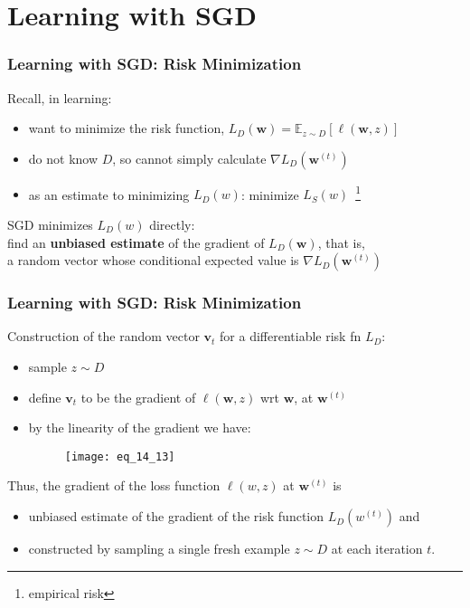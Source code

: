 \section{Learning with SGD}

\begin{frame}
\frametitle{Learning with SGD: Risk Minimization}

Recall, in learning:\\
\begin{itemize}
\item want to minimize the risk function, $L_D(\mathbf{w}) = \mathbb{E}_{z \sim D} [\ell(\mathbf{w}, z)]$
\item do not know $D$, so cannot simply calculate $\nabla L_D (\mathbf{w}^{(t)} )$
\item as an estimate to minimizing $L_D(w)$: minimize $L_S(w)$~\footnote{empirical risk}
\end{itemize}
\vspace{5mm}

SGD minimizes $L_D(w)$ directly:\\
find an \textbf{unbiased estimate} of the gradient of $L_D(\mathbf{w})$, that is,\\
a random vector whose conditional expected value is $\nabla L_D (\mathbf{w}^{(t)} )$

\end{frame}


\begin{frame}
\frametitle{Learning with SGD: Risk Minimization}

Construction of the random vector $\mathbf{v}_t$ for  a differentiable risk fn $L_D$:
\begin{itemize}
\item sample $z \sim D$
\item define $\mathbf{v}_t$ to be the gradient of $\ell(\mathbf{w}, z)$ wrt $\mathbf{w}$, at $\mathbf{w}^{(t)}$
\item by the linearity of the gradient we have:
    \begin{figure}
        \centering
        \texttt{[image: eq\_14\_13]}
    \end{figure}
\end{itemize}
\vspace{5mm}

Thus, the gradient of the loss function $\ell(w, z)$ at $\mathbf{w}^{(t)}$ is
\begin{itemize}
\item unbiased estimate of the gradient of the risk function $L_D( w^{(t)} )$ and
\item constructed by sampling a single fresh example $z \sim D$ at each iteration $t$.
\end{itemize}

\end{frame}


